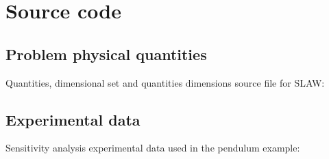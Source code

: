 \section{Source code}

\subsection{Problem physical quantities}\label{app:physicalquantitiesslaw}
Quantities, dimensional set and quantities dimensions source file for SLAW:
\begingroup\scriptsize

\endgroup\normalsize

\subsection{Experimental data}\label{app:experimentaldataslaw}
Sensitivity analysis experimental data used in the pendulum example:
\begingroup\scriptsize

\endgroup\normalsize
